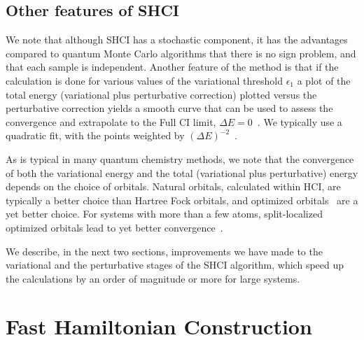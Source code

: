 \documentclass[%
preprint,
 superscriptaddress,
 amsmath,amssymb,
 aps,
]{revtex4-1}
\begin{document}
\subsection{Other features of SHCI}
\label{other_features}
We note that although SHCI has a stochastic component, it has the advantages compared to quantum Monte Carlo algorithms that there is no sign problem,
and that each sample is independent.
Another feature of the method is that if the calculation is done for various values of the variational threshold $\epsilon_1$
a plot of the total energy (variational plus perturbative correction) plotted versus the perturbative correction yields a smooth curve that can be used to assess the convergence and extrapolate to the Full CI limit,  $\Delta E=0$~\cite{HolUmrSha-JCP-17}.
We typically use a quadratic fit, with the points weighted by $\left(\Delta E\right)^{-2}$~\cite{ChiHolOttUmrShaZim-JPCA-18}.

As is typical in many quantum chemistry methods, we note that the convergence of both the variational energy and the total (variational plus perturbative) energy
depends on the choice of orbitals.  Natural orbitals, calculated within HCI, are typically a better choice than Hartree Fock orbitals,
and optimized orbitals~\cite{SmiMusHolSha-JCTC-17} are a yet better choice.  For systems with more than a few atoms,
split-localized optimized orbitals lead to yet better convergence~\cite{ChiHolOttUmrShaZim-JPCA-18}.

We describe, in the next two sections, improvements we have made to the variational and the perturbative stages of the SHCI algorithm,
which speed up the calculations by an order of magnitude or more for large systems.

\section{Fast Hamiltonian Construction}
\label{fast}
\end{document}
